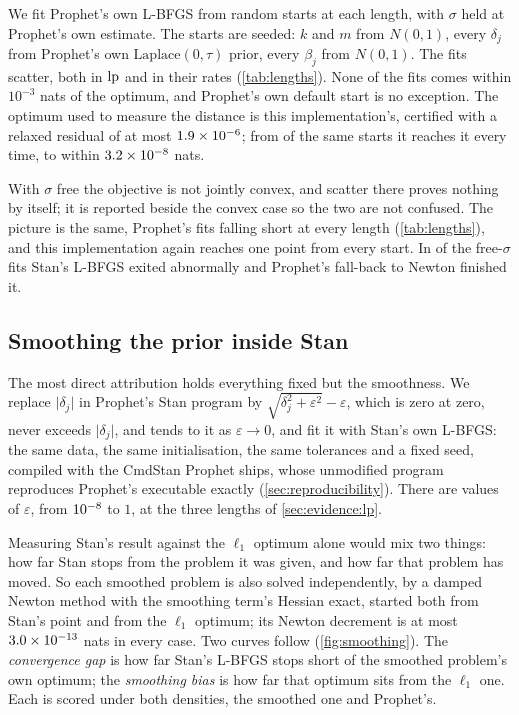 We fit Prophet's own L-BFGS from \MultiStarts{} random starts at each length, with
$\sigma$ held at Prophet's own estimate. The starts are seeded: $k$ and $m$ from
$N(0, 1)$, every $\delta_j$ from Prophet's own $\mathrm{Laplace}(0, \tau)$ prior, every
$\beta_j$ from $N(0, 1)$. The fits scatter, both in $\mathrm{lp}$ and in their rates
(\cref{tab:lengths}). None of the \MultiTotal{} fits comes within $10^{-3}$ nats of
the optimum, and Prophet's own default start is no exception. The optimum used to
measure the distance is this implementation's, certified with a relaxed residual of at
most
$1.9\times10^{-6}$; from \MultiOurs{} of the same starts it reaches it every time,
to within $3.2\times10^{-8}$ nats.

With $\sigma$ free the objective is not jointly convex, and scatter there proves nothing
by itself; it is reported beside the convex case so the two are not confused. The
picture is the same, Prophet's fits falling short at every length
(\cref{tab:lengths}), and this implementation again reaches one point from every
start. In \MultiFallbacks{} of the free-$\sigma$ fits Stan's L-BFGS exited abnormally
and Prophet's fall-back to Newton finished it.

\subsection{Smoothing the prior inside Stan}
\label{sec:evidence:surrogate}

The most direct attribution holds everything fixed but the smoothness. We replace
$\lvert\delta_j\rvert$ in Prophet's Stan program by
$\sqrt{\delta_j^2 + \varepsilon^2} - \varepsilon$, which is zero at zero, never exceeds
$\lvert\delta_j\rvert$, and tends to it as $\varepsilon \to 0$, and fit it with Stan's
own L-BFGS: the same data, the same initialisation, the same tolerances and a fixed
seed, compiled with the CmdStan Prophet ships, whose unmodified program reproduces
Prophet's executable exactly (\cref{sec:reproducibility}). There are \SmoothValues{}
values of $\varepsilon$, from $10^{-8}$ to $1$, at the three lengths of
\cref{sec:evidence:lp}.

Measuring Stan's result against the $\ell_1$ optimum alone would mix two things: how
far Stan stops from the problem it was given, and how far that problem has moved. So
each smoothed problem is also solved independently, by a damped Newton method with the
smoothing term's Hessian exact, started both from Stan's point and from the $\ell_1$
optimum; its Newton decrement is at most $3.0\times10^{-13}$ nats in every case. Two
curves follow (\cref{fig:smoothing}). The \emph{convergence gap} is how far Stan's
L-BFGS stops short of the smoothed problem's own optimum; the \emph{smoothing bias} is
how far that optimum sits from the $\ell_1$ one. Each is scored under both densities, the
smoothed one and Prophet's.

